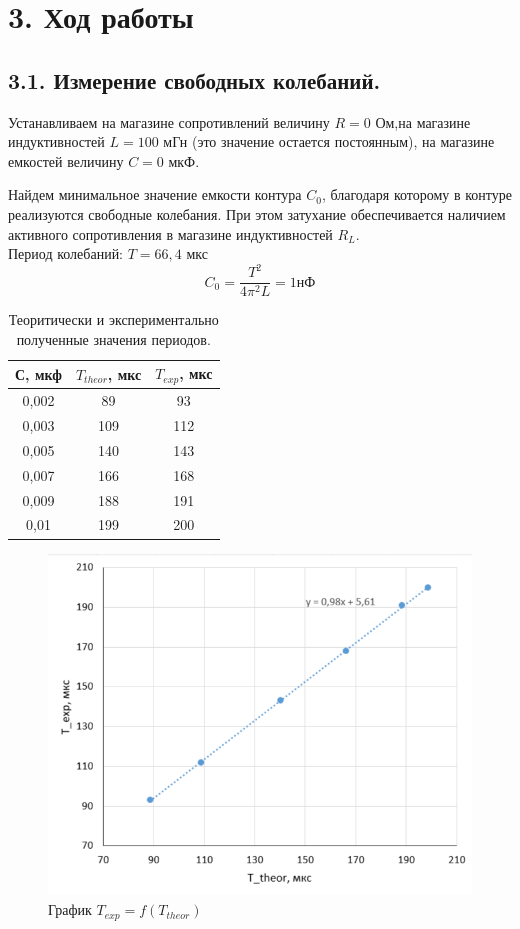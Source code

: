 \documentclass[a4paper,12pt]{article}
\begin{document}
\section*{3. Ход работы}

\subsection*{3.1. Измерение свободных колебаний.}

Устанавливаем на магазине сопротивлений величину $R = 0$ Ом,на магазине индуктивностей $L = 100$ мГн (это значение остается постоянным), на магазине емкостей величину $C = 0$ мкФ.

Найдем минимальное значение емкости контура $C_0$, благодаря которому в контуре реализуются свободные колебания. При этом затухание обеспечивается наличием активного сопротивления в магазине индуктивностей $R_L$.\\
Период колебаний: $T = 66,4$ мкс
$$
C_0=\frac{T^2}{4\pi^2L}=1\text{нФ}
$$

\begin{table}[!ht]
    \centering
    \begin{tabular}{|c|c|c|}
    \hline
        С, мкф & $T_{theor}$, мкс & $T_{exp}$, мкс \\ \hline
        0,002 & 89 & 93 \\ \hline
        0,003 & 109 & 112 \\ \hline
        0,005 & 140 & 143 \\ \hline
        0,007 & 166 & 168 \\ \hline
        0,009 & 188 & 191 \\ \hline
        0,01 & 199 & 200 \\ \hline
    \end{tabular}
\caption{Теоритически и экспериментально полученные значения периодов.}
\end{table}

\begin{figure}[h]
    \includegraphics[scale=0.5]{1.png}
    \centering
    \caption{График $T_{exp}=f(T_{theor})$}
\end{figure}
\end{document}
